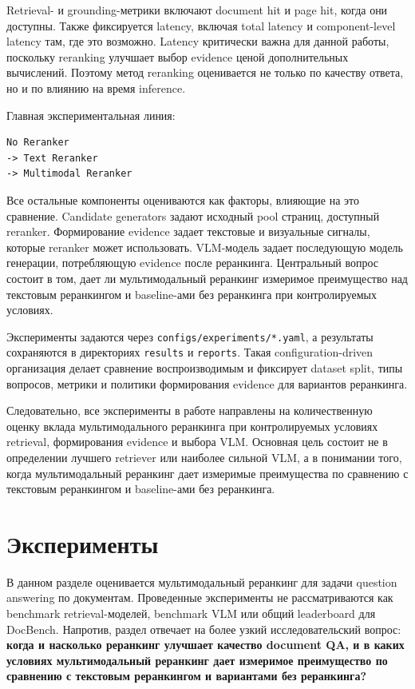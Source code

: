 \documentclass[conference]{IEEEtran}
\begin{document}
Retrieval- и grounding-метрики включают document hit и page hit, когда они доступны. Также фиксируется latency, включая total latency и component-level latency там, где это возможно. Latency критически важна для данной работы, поскольку reranking улучшает выбор evidence ценой дополнительных вычислений. Поэтому метод reranking оценивается не только по качеству ответа, но и по влиянию на время inference.

Главная экспериментальная линия:

\begin{verbatim}
No Reranker
-> Text Reranker
-> Multimodal Reranker
\end{verbatim}

Все остальные компоненты оцениваются как факторы, влияющие на это сравнение. Candidate generators задают исходный pool страниц, доступный reranker. Формирование evidence задает текстовые и визуальные сигналы, которые reranker может использовать. VLM-модель задает последующую модель генерации, потребляющую evidence после реранкинга. Центральный вопрос состоит в том, дает ли мультимодальный реранкинг измеримое преимущество над текстовым реранкингом и baseline-ами без реранкинга при контролируемых условиях.

Эксперименты задаются через \texttt{configs/experiments/*.yaml}, а результаты сохраняются в директориях \texttt{results} и \texttt{reports}. Такая configuration-driven организация делает сравнение воспроизводимым и фиксирует dataset split, типы вопросов, метрики и политики формирования evidence для вариантов реранкинга.

Следовательно, все эксперименты в работе направлены на количественную оценку вклада мультимодального реранкинга при контролируемых условиях retrieval, формирования evidence и выбора VLM. Основная цель состоит не в определении лучшего retriever или наиболее сильной VLM, а в понимании того, когда мультимодальный реранкинг дает измеримые преимущества по сравнению с текстовым реранкингом и baseline-ами без реранкинга.


\section{Эксперименты}

В данном разделе оценивается мультимодальный реранкинг для задачи question answering по документам. Проведенные эксперименты не рассматриваются как benchmark retrieval-моделей, benchmark VLM или общий leaderboard для DocBench. Напротив, раздел отвечает на более узкий исследовательский вопрос: \textbf{когда и насколько реранкинг улучшает качество document QA, и в каких условиях мультимодальный реранкинг дает измеримое преимущество по сравнению с текстовым реранкингом и вариантами без реранкинга?}
\end{document}
